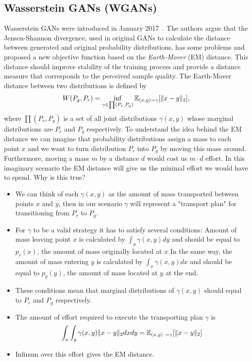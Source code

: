\subsection{Wasserstein GANs (WGANs)}
Wasserstein GANs were introduced in January 2017~\citep{wgan}. The authors argue that the Jensen-Shannon divergence, used in original GANs to calculate the distance between generated and original probability distributions, has some problems and proposed a new objective function based on the \textit{Earth-Mover} (EM)  distance. This distance should improve stability of the training process and provide a distance measure that corresponds to the perceived sample quality. 
	The Earth-Mover distance between two distributions is defined by
\begin{equation}
	W(P_g, P_r) =  \inf_{\gamma \in \prod (P_r, P_g)}  \operatorname{\mathbb{E}}_{(x,y) \sim \gamma} [ \lVert x - y \lVert_2 ],
\end{equation}
where $\prod (P_r, P_g)$ is a set of all joint distributions $\gamma(x,y)$ whose marginal distributions are $P_r$ and $P_g$ respectively. To understand the idea behind the EM distance we can imagine that probability distributions assign a mass to each point $x$ and we want to turn distribution $P_r$ into $P_g$ by moving this mass around. Furthermore, moving a mass $m$ by a distance $d$ would cost us $m \cdot d$ effort. In this imaginary scenario the EM distance will give us the minimal effort we would have to spend. Why is this true? 
\begin{itemize}
	\item We can think of each $\gamma(x, y)$ as the amount of mass transported between points $x$ and $y$, then in our scenario $\gamma$ will represent a "transport plan" for transitioning from $P_r$ to $P_g$.
	\item For $\gamma$ to be a valid strategy it has to satisfy several conditions:
		\subitem Amount of mass leaving point $x$ is calculated by $\int_y \gamma(x, y) dy$ and should be equal to $p_r(x)$, the amount of mass originally located at $x$
		\subitem In the same way, the amount of mass entering $y$ is calculated by $\int_x \gamma(x, y) dx$ and should be equal to $p_g(y)$, the amount of mass located at $y$ at the end.
	\item These conditions mean that marginal distributions of $\gamma(x, y)$ should equal to $P_r$ and $P_g$ respectively. 
	\item The amount of effort required to execute the transporting plan $\gamma$ is 
	\begin{equation}
	\int_x \int_y \gamma(x,y) \lVert x - y \lVert_2 dx dy = \operatorname{\mathbb{E}}_{(x,y) ~\sim \gamma} [ \lVert x - y \lVert_2 ]
	\end{equation}
	\item Infinum over this effort gives the EM distance. 
\end{itemize}


